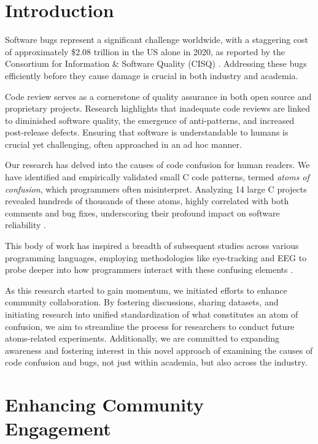 \documentclass[conference]{IEEEtran}
\begin{document}
\section{Introduction}

Software bugs represent a significant challenge worldwide, with a staggering cost of approximately \$2.08 trillion in the US alone in 2020, as reported by the Consortium for Information \& Software Quality (CISQ) \cite{CPSQ2020}. Addressing these bugs efficiently before they cause damage is crucial in both industry and academia.

Code review serves as a cornerstone of quality assurance in both open source and proprietary projects. Research highlights that inadequate code reviews are linked to diminished software quality, the emergence of anti-patterns, and increased post-release defects. Ensuring that software is understandable to humans is crucial yet challenging, often approached in an ad hoc manner.

Our research has delved into the causes of code confusion for human readers. We have identified and empirically validated small C code patterns, termed \emph{atoms of confusion}, which programmers often misinterpret. Analyzing 14 large C projects revealed hundreds of thousands of these atoms, highly correlated with both comments and bug fixes, underscoring their profound impact on software reliability \cite{gopstein2018prevalence}.

This body of work has inspired a breadth of subsequent studies across various programming languages, employing methodologies like eye-tracking and EEG to probe deeper into how programmers interact with these confusing elements \cite{langhout2021atoms, mendes2021bohr, mendes2022dazed, torres2023investigation, dacosta2023seeing, Manor2018AtomsConfusionSwift, yeh2017detecting}.

As this research started to gain momentum, we initiated efforts to enhance community collaboration. By fostering discussions, sharing datasets, and initiating research into unified standardization of what constitutes an atom of confusion, we aim to streamline the process for researchers to conduct future atoms-related experiments. Additionally, we are committed to expanding awareness and fostering interest in this novel approach of examining the causes of code confusion and bugs, not just within academia, but also across the industry.


\section{ Enhancing Community Engagement}
\end{document}
